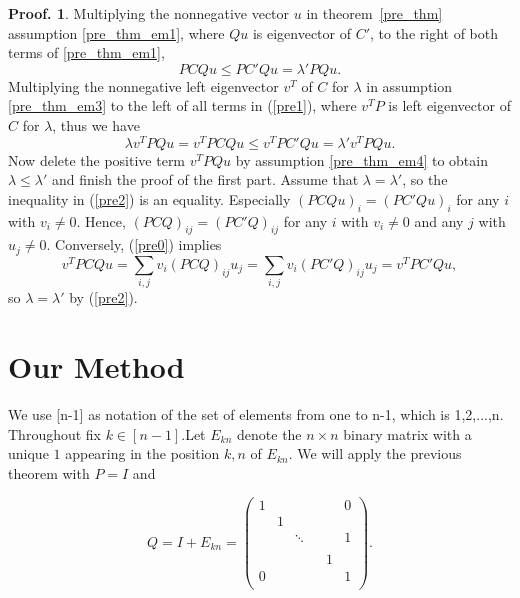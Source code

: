 \documentclass{article}
\theoremstyle{plain}
\theoremstyle{definition}
\newtheorem{pof}[thm]{Proof.}
\begin{document}
\begin{pof}
    Multiplying the nonnegative vector $u$ in theorem~\ref{pre_thm} assumption
    \ref{pre_thm_em1}, where $Qu$ is eigenvector of $C'$,  to the right of both terms of
    \ref{pre_thm_em1},    
    \begin{equation}\label{pre1}
       PCQu\leq PC'Qu=\lambda'PQu.
    \end{equation}
    Multiplying the nonnegative left eigenvector $v^T$ of $C$ for $\lambda$ in assumption
     \ref{pre_thm_em3} to the left of all terms  in (\ref{pre1}), where $v^TP$ is
    left eigenvector of $C$ for $\lambda$, thus we have
    \begin{equation}\label{pre2}
        \lambda v^TPQu=v^TPCQu\leq v^TPC'Qu=\lambda' v^TPQu.
    \end{equation}
        Now delete the positive term $v^TPQu$ by assumption \ref{pre_thm_em4} to obtain
        $\lambda\leq \lambda'$ and finish the proof of the first part.
        Assume that $\lambda=\lambda'$, so the inequality in (\ref{pre2}) is an equality.
        Especially $(PCQu)_i=(PC'Qu)_i$ for any $i$ with $v_i\not=0.$ Hence,
        $(PCQ)_{ij}=(PC'Q)_{ij}$ for any $i$ with $v_i\not=0$ and any $j$ with
        $u_j\not=0.$ Conversely, (\ref{pre0}) implies $$v^TPCQu=\sum_{i,j} v_i(PCQ)_{ij}u_j=
         \sum_{i,j} v_i(PC'Q)_{ij}u_j=v^TPC'Qu,$$ so $\lambda=\lambda'$ by (\ref{pre2}).


\section{Our Method}
We use [n-1] as notation of the set of elements from one to n-1, which is {1,2,$...$,n}.
Throughout fix $k\in [n-1]$.Let $E_{kn}$ denote the $n\times n$ binary matrix with a unique $1$ appearing in the position $k,n$ of $E_{kn}$. We will apply the previous theorem with $P=I$ and 



\begin{equation}
Q=I+E_{kn}=\begin{pmatrix} \label{Q_1}
1 &  & & &  & 0 \\
 & 1 &  &      &  &  \\
 &  & \ddots & &  & 1 \\
 &  &        & &  &  \\
  &  & & & 1 &  \\
0 &  & & &  & 1 \\
\end{pmatrix}.
\end{equation}







\end{pof}
\end{document}
